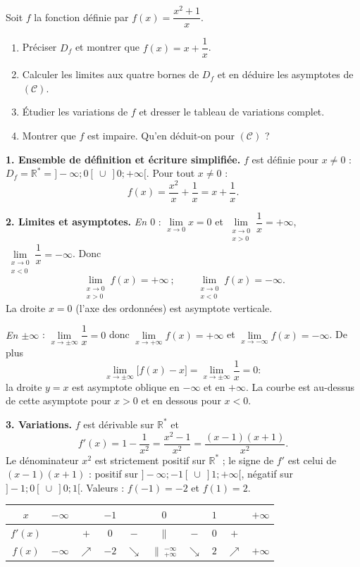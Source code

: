 \documentclass[11pt]{article}
\newcommand{\cle}[1]{{\popxbold\color{popdark}#1}}
\begin{document}
\begin{exoresolu}[Étude guidée de $f(x)=\dfrac{x^2+1}{x}$ puis lecture graphique (type Bac A)]
Soit $f$ la fonction définie par $f(x)=\dfrac{x^2+1}{x}$.
\begin{enumerate}
\item Préciser $D_f$ et montrer que $f(x)=x+\dfrac{1}{x}$.
\item Calculer les limites aux quatre bornes de $D_f$ et en déduire les asymptotes de $(\mathcal{C})$.
\item Étudier les variations de $f$ et dresser le tableau de variations complet.
\item Montrer que $f$ est impaire. Qu'en déduit-on pour $(\mathcal{C})$ ?
\end{enumerate}
\tcblower
\textbf{1. Ensemble de définition et écriture simplifiée.} $f$ est définie pour $x\neq 0$ : $D_f=\mathbb{R}^*=]-\infty;0[\ \cup\ ]0;+\infty[$. Pour tout $x\neq 0$ :
\[
f(x)=\frac{x^2}{x}+\frac{1}{x}=x+\frac{1}{x}.
\]

\textbf{2. Limites et asymptotes.}
\emph{En $0$} : $\lim\limits_{x\to 0}x=0$ et $\lim\limits_{\substack{x\to 0\\x>0}}\dfrac{1}{x}=+\infty$, $\lim\limits_{\substack{x\to 0\\x<0}}\dfrac{1}{x}=-\infty$. Donc
\[
\lim_{\substack{x\to 0\\x>0}} f(x)=+\infty \ ;\qquad \lim_{\substack{x\to 0\\x<0}} f(x)=-\infty.
\]
La droite $x=0$ (l'axe des ordonnées) est \cle{asymptote verticale}.

\emph{En $\pm\infty$} : $\lim\limits_{x\to\pm\infty}\dfrac{1}{x}=0$ donc $\lim\limits_{x\to+\infty}f(x)=+\infty$ et $\lim\limits_{x\to-\infty}f(x)=-\infty$. De plus
\[
\lim_{x\to\pm\infty}\big[f(x)-x\big]=\lim_{x\to\pm\infty}\frac{1}{x}=0 :
\]
la droite $y=x$ est \cle{asymptote oblique} en $-\infty$ et en $+\infty$. La courbe est au-dessus de cette asymptote pour $x>0$ et en dessous pour $x<0$.

\textbf{3. Variations.} $f$ est dérivable sur $\mathbb{R}^*$ et
\[
f'(x)=1-\frac{1}{x^2}=\frac{x^2-1}{x^2}=\frac{(x-1)(x+1)}{x^2}.
\]
Le dénominateur $x^2$ est strictement positif sur $\mathbb{R}^*$ ; le signe de $f'$ est celui de $(x-1)(x+1)$ : positif sur $]-\infty;-1[\ \cup\ ]1;+\infty[$, négatif sur $]-1;0[\ \cup\ ]0;1[$.
Valeurs : $f(-1)=-2$ et $f(1)=2$.
\begin{center}
\begin{tabular}{|c|ccccccccc|}
\hline
$x$ & $-\infty$ & & $-1$ & & $0$ & & $1$ & & $+\infty$ \\
\hline
$f'(x)$ & & $+$ & $0$ & $-$ & $\|$ & $-$ & $0$ & $+$ & \\
\hline
$f(x)$ & $-\infty$ & $\nearrow$ & $-2$ & $\searrow$ & $\|\ ^{-\infty}_{+\infty}$ & $\searrow$ & $2$ & $\nearrow$ & $+\infty$ \\
\hline
\end{tabular}
\end{center}


\end{exoresolu}
\end{document}
